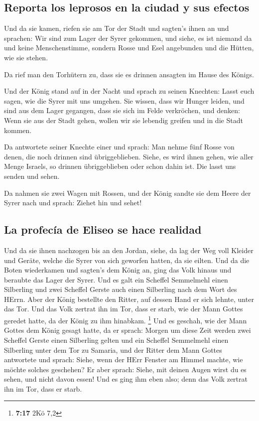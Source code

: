 \hypertarget{reporta-los-leprosos-en-la-ciudad-y-sus-efectos}{%
\subsection{Reporta los leprosos en la ciudad y sus
efectos}\label{reporta-los-leprosos-en-la-ciudad-y-sus-efectos}}

 Und da sie kamen, riefen sie am Tor der Stadt und
sagten's ihnen an und sprachen: Wir sind zum Lager der Syrer gekommen,
und siehe, es ist niemand da und keine Menschenstimme, sondern Rosse und
Esel angebunden und die Hütten, wie sie stehen.

 Da rief man den Torhütern zu, dass sie es drinnen
ansagten im Hause des Königs.

 Und der König stand auf in der Nacht und sprach zu
seinen Knechten: Lasst euch sagen, wie die Syrer mit uns umgehen. Sie
wissen, dass wir Hunger leiden, und sind aus dem Lager gegangen, dass
sie sich im Felde verkröchen, und denken: Wenn sie aus der Stadt gehen,
wollen wir sie lebendig greifen und in die Stadt kommen.

 Da antwortete seiner Knechte einer und sprach: Man nehme
fünf Rosse von denen, die noch drinnen sind übriggeblieben. Siehe, es
wird ihnen gehen, wie aller Menge Israels, so drinnen übriggeblieben
oder schon dahin ist. Die lasst uns senden und sehen.

 Da nahmen sie zwei Wagen mit Rossen, und der König
sandte sie dem Heere der Syrer nach und sprach: Ziehet hin und sehet!

\hypertarget{la-profecuxeda-de-eliseo-se-hace-realidad}{%
\subsection{La profecía de Eliseo se hace
realidad}\label{la-profecuxeda-de-eliseo-se-hace-realidad}}

 Und da sie ihnen nachzogen bis an den Jordan, siehe, da
lag der Weg voll Kleider und Geräte, welche die Syrer von sich geworfen
hatten, da sie eilten. Und da die Boten wiederkamen und sagten's dem
König an,  ging das Volk hinaus und beraubte das Lager
der Syrer. Und es galt ein Scheffel Semmelmehl einen Silberling und zwei
Scheffel Gerste auch einen Silberling nach dem Wort des HErrn.
 Aber der König bestellte den Ritter, auf dessen Hand er
sich lehnte, unter das Tor. Und das Volk zertrat ihn im Tor, dass er
starb, wie der Mann Gottes geredet hatte, da der König zu ihm hinabkam.
\footnote{\textbf{7:17} 2Kö 7,2}  Und es geschah, wie der
Mann Gottes dem König gesagt hatte, da er sprach: Morgen um diese Zeit
werden zwei Scheffel Gerste einen Silberling gelten und ein Scheffel
Semmelmehl einen Silberling unter dem Tor zu Samaria, 
und der Ritter dem Mann Gottes antwortete und sprach: Siehe, wenn der
HErr Fenster am Himmel machte, wie möchte solches geschehen? Er aber
sprach: Siehe, mit deinen Augen wirst du es sehen, und nicht davon
essen!  Und es ging ihm eben also; denn das Volk zertrat
ihn im Tor, dass er starb.

